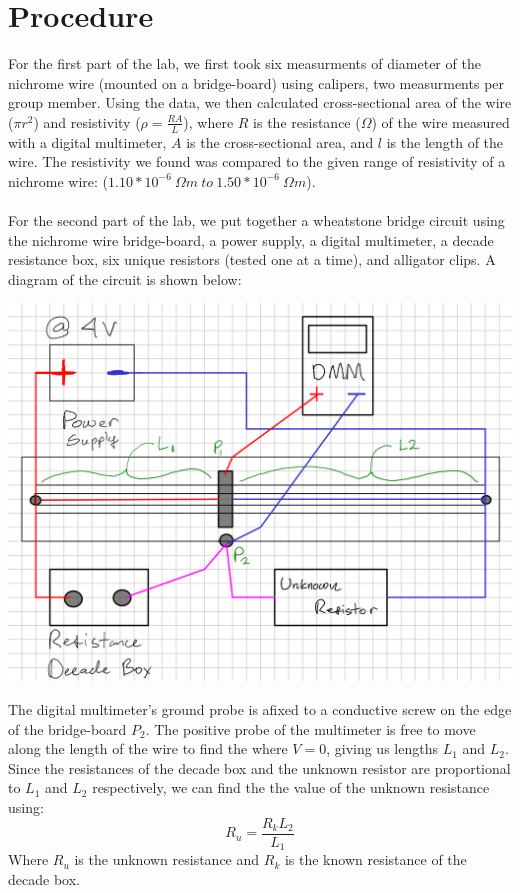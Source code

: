 \documentclass[titlepage]{article}
\begin{document}
	\section{Procedure}
	For the first part of the lab, we first took six measurments of diameter 
	of the nichrome wire (mounted on a bridge-board) using calipers, two measurments per group member.
	Using the data, we then calculated cross-sectional area of the wire ($\pi r^2$) and resistivity 
	($\rho = \frac{RA}{L}$), where $R$ is the resistance ($\Omega$) of the wire measured with a 
	digital multimeter, $A$ is the cross-sectional area, and $l$ is the length of the wire.  
	The resistivity we found was compared to the given range of resistivity of a 
	nichrome wire: ($1.10*10^{-6}~\Omega m~to~1.50*10^{-6}~\Omega m$). \\
	~\\  
	For the second part of the lab, we put together a wheatstone bridge circuit using 
	the nichrome wire bridge-board, a power supply, a digital multimeter, a decade 
	resistance box, six unique resistors (tested one at a time), and alligator clips.
	A diagram of the circuit is shown below: 

	\begin{center}
		\includegraphics[scale=.2]{lab-circuit-diagram.png}
	\end{center}

	The digital multimeter's ground probe is afixed to a conductive screw on the edge of the 
	bridge-board $P_2$. The positive probe of the multimeter is free to move along the length 
	of the wire to find the where $V=0$, giving us lengths $L_1$ and $L_2$. Since the 
	resistances of the decade box and the unknown resistor are proportional to $L_1$ and $L_2$
	respectively, we can find the the value of the unknown resistance using:
	\[
		R_u=\frac{R_k L_2}{L_1}	
	\]
	Where $R_u$ is the unknown resistance and $R_k$ is the known resistance of the decade box. 
	
\end{document}
